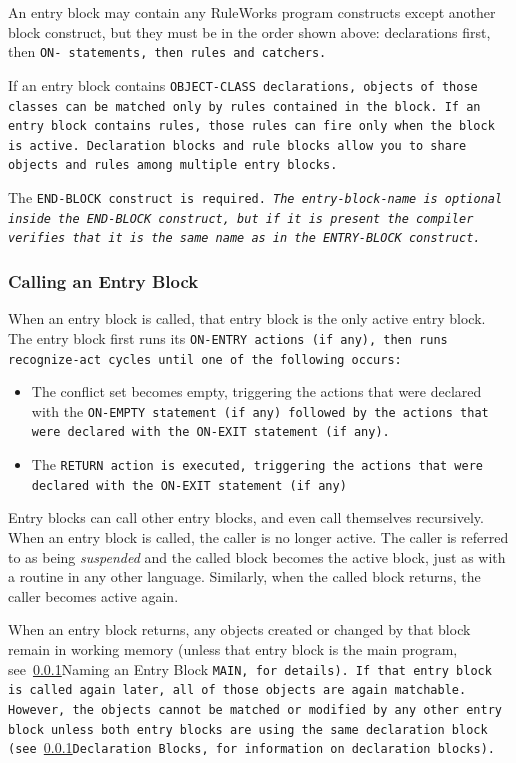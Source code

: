 An entry block may contain any RuleWorks program constructs except
another block construct, but they must be in the order shown above:
declarations first, then \tt{ON-} statements, then rules and catchers.

If an entry block contains \tt{OBJECT-CLASS} declarations, objects of
those classes can be matched only by rules contained in the block.  If
an entry block contains rules, those rules can fire only when the
block is active.  Declaration blocks and rule blocks allow you to
share objects and rules among multiple entry blocks.

The \tt{END-BLOCK} construct is required. \it{The entry-block-name} is
optional inside the \tt{END-BLOCK} construct, but if it is present the
compiler verifies that it is the same name as in the \tt{ENTRY-BLOCK}
construct.

\subsubsection{Calling an Entry Block}

When an entry block is called, that entry block is the only active
entry block. The entry block first runs its \tt{ON-ENTRY} actions (if
any), then runs recognize-act cycles until one of the following
occurs:
\begin{itemize}
\item The conflict set becomes empty, triggering the actions that were
  declared with the \tt{ON-EMPTY} statement (if any) followed by the
  actions that were declared with the \tt{ON-EXIT} statement (if any).
\item The \tt{RETURN} action is executed, triggering the actions that
  were declared with the \tt{ON-EXIT} statement (if any)
\end{itemize}

Entry blocks can call other entry blocks, and even call themselves
recursively. When an entry block is called, the caller is no longer
active. The caller is referred to as being \emph{suspended} and the
called block becomes the active block, just as with a routine in any
other language. Similarly, when the called block returns, the caller
becomes active again.

When an entry block returns, any objects created or changed by that
block remain in working memory (unless that entry block is the main
program, see~\ref{}Naming an Entry Block \tt{MAIN}, for details). If
that entry block is called again later, all of those objects are again
matchable. However, the objects cannot be matched or modified by any
other entry block unless both entry blocks are using the same
declaration block (see~\ref{}Declaration Blocks, for information on
declaration blocks).

